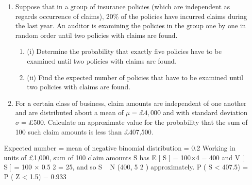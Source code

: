 \documentclass[a4paper,12pt]{article}
\begin{document}
\begin{enumerate}

\item Suppose that in a group of insurance policies (which are independent as regards
occurrence of claims), 20\% of the policies have incurred claims during the last year.
An auditor is examining the policies in the group one by one in random order until
two policies with claims are found.
\begin{enumerate}
\item (i) Determine the probability that exactly five policies have to be examined until
two policies with claims are found.
\item 
(ii) Find the expected number of policies that have to be examined until two
policies with claims are found.
\end{enumerate}

\item For a certain class of business, claim amounts are independent of one another and are
distributed about a mean of $\mu = £4,000$ and with standard deviation $\sigma = £500$.
Calculate an approximate value for the probability that the sum of 100 such claim
amounts is less than £407,500.

\end{enumerate}

\newpage







Expected number = mean of negative binomial distribution =
0.2
Working in units of £1,000, sum of 100 claim amounts S has E [ S ] = 100×4 = 400 and
V [ S ] = 100 × 0.5 2 = 25, and so S ~ N (400, 5 2 ) approximately.
P ( S < 407.5) = P ( Z < 1.5) = 0.933
\end{document}
